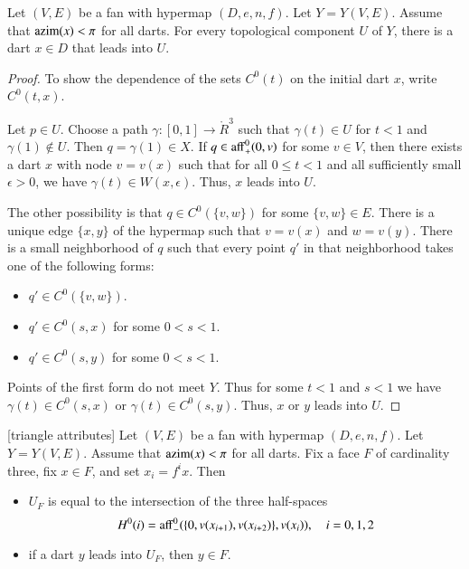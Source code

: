 {\begin{lemma}
Let $(V,E)$ be a fan with hypermap $(D,e,n,f)$. Let $Y=Y(V,E)$. Assume that ${\operatorname{azim}}(x)<\pi$ for all darts.  For every topological component $U$ of $Y$, there is a dart $x\in D$ that leads into $U$.
\end{lemma}

\begin{proof}  
To show the dependence of the sets $C^0(t)$ on the initial dart $x$, write $C^0(t,x)$.

Let $p\in U$.  Choose a path $\gamma:[0,1]\to \ring{R}^3$
such that $\gamma(t)\in U$ for $t<1$ and $\gamma(1)\not\in U$.  Then
$q=\gamma(1)\in X$.  If $q\in{\operatorname{aff}}^0_+(0,v)$ for some $v\in V$,
then there exists a dart $x$ with node $v = v(x)$ such that for 
all $0\le t < 1$ and all sufficiently
small $\epsilon>0$, we have $\gamma(t)\in W(x,\epsilon)$.  Thus,
$x$ leads into $U$.

The other possibility is that
$q\in C^0(\{v,w\})$ for some $\{v,w\}\in E$.  There is a unique
edge $\{x,y\}$ of the hypermap such that $v=v(x)$ and $w=v(y)$.  
There
is a small neighborhood of $q$ such that every point $q'$ in that neighborhood
takes one of the following forms:
\begin{itemize} \item $q'\in C^0(\{v,w\})$.
\item $q'\in C^0(s,x)$ for some $0<s<1$.
\item $q'\in C^0(s,y)$ for some $0<s<1$.
\end{itemize}
Points of the first form do not meet $Y$.  Thus for some $t<1$ and $s<1$
we have $\gamma(t)\in C^0(s,x)$ or $\gamma(t)\in C^0(s,y)$.  Thus,
$x$ or $y$ leads into $U$.
\end{proof}

\begin{lemma}[triangle attributes] \label{lemma:triangle}
Let $(V,E)$ be a fan with hypermap $(D,e,n,f)$. 
Let $Y=Y(V,E)$.
Assume that ${\operatorname{azim}}(x)<\pi$
for all darts.  Fix a face $F$ of cardinality three, fix
$x\in F$, and set $x_i = f^i x$. Then
\begin{itemize}  
\item $U_F$ is equal to the intersection of the three half-spaces
$$H^0(i)={\operatorname{aff}}_-^0(\{0,v(x_{i+1}),v(x_{i+2})\},v(x_i)),\quad i=0,1,2$$
\item if a dart $y$ leads into $U_F$, then $y\in F$.
\end{itemize}
\end{lemma}

}
